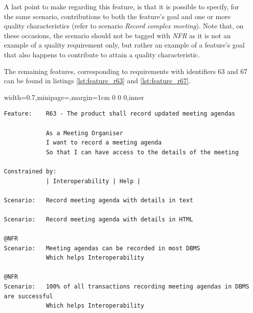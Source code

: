 \documentclass[dissertation,final]{softeng}
\newenvironment{featurecode}[1]
{ \lrbox\featurebox \begin{adjustbox}{width=#1\textwidth,minipage=\textwidth,margin=1cm 0 0 0,inner} }
{ \end{adjustbox}\endlrbox}
\newenvironment{featurelist}[2]
{
\newcommand{\setcaption}{\caption{#1}}
\newcommand{\setlabel}{\label{#2}}
}
{\begin{listing}[h!]\centering\usebox\featurebox\setcaption\setlabel\end{listing}}
\begin{document}
A last point to make regarding this feature, is that it is possible to specify, for the same scenario, contributions to both the feature's goal and one or more quality characteristics (refer to scenario \emph{Record complex meeting}). Note that, on these occasions, the scenario should not be tagged with \emph{NFR} as it is not an example of a quality requirement only, but rather an example of a feature's goal that also happens to contribute to attain a quality characteristic.

The remaining features, corresponding to requirements with identifiers 63 and 67 can be found in listings \ref{lst:feature_r63} and \ref{lst:feature_r67}.

\begin{featurelist}{Changes to Gherkin -- R63 -- The product shall record updated meeting agendas}{lst:feature_r63}
\begin{featurecode}{0.7}
\begin{verbatim}
Feature:    R63 - The product shall record updated meeting agendas

            As a Meeting Organiser
            I want to record a meeting agenda
            So that I can have access to the details of the meeting
	
Constrained by:
            | Interoperability | Help |

Scenario:   Record meeting agenda with details in text

Scenario:   Record meeting agenda with details in HTML

@NFR	
Scenario:   Meeting agendas can be recorded in most DBMS
            Which helps Interoperability

@NFR	
Scenario:   100% of all transactions recording meeting agendas in DBMS are successful
            Which helps Interoperability
\end{verbatim}
\end{featurecode}
\end{featurelist}
\end{document}
